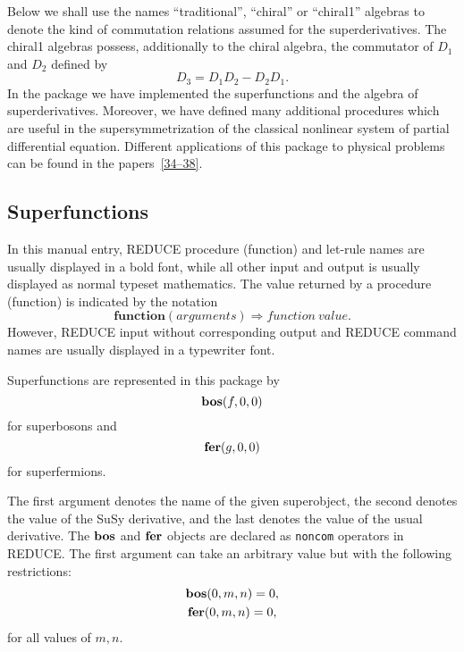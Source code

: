{Below we shall use the names ``traditional'', ``chiral'' or
``chiral1'' algebras to denote the kind of commutation relations
assumed for the superderivatives.  The chiral1 algebras possess,
additionally to the chiral algebra, the commutator of $D_{1}$ and
$D_{2}$ defined by
\begin{equation*}
  D_{3} = D_{1} D_{2} -D_{2} D_{1}.
\end{equation*}
In the  package we have implemented the superfunctions
and the algebra of superderivatives.  Moreover, we have defined many
additional procedures which are useful in the supersymmetrization of
the classical nonlinear system of partial differential equation.
Different applications of this package to physical problems can be
found in the papers~\hyperlink{susy2-bib}{[34--38]}.

\subsection{Superfunctions}

In this manual entry, REDUCE procedure (function) and let-rule names
are usually displayed in a bold font, while all other input and output
is usually displayed as normal typeset mathematics.  The value
returned by a procedure (function) is indicated by the notation
\begin{equation*}
  \mathbf{function}(\mathit{arguments}) \Rightarrow
  \mathit{function~value}.
\end{equation*}
However, REDUCE input without corresponding output and REDUCE command
names are usually displayed in a typewriter font.

Superfunctions are represented in this package by
\begin{equation}\label{susy2-eqn1}
  \mathbf{bos}(f,0,0)
\end{equation}
for superbosons and
\begin{equation*}
  \mathbf{fer}(g,0,0)
\end{equation*}
for superfermions.

The first argument denotes the name of the given superobject, the
second denotes the value of the SuSy derivative, and the last denotes
the value of the usual derivative.  The $\mathbf{bos}$ and
$\mathbf{fer}$ objects are declared as \texttt{noncom} operators in
REDUCE\@.  The first argument can take an arbitrary value but with the
following restrictions:
\begin{gather*}
  \mathbf{bos}(0,m,n) = 0, \\
  \mathbf{fer}(0,m,n) = 0,
\end{gather*}
for all values of $m,n$.

}
